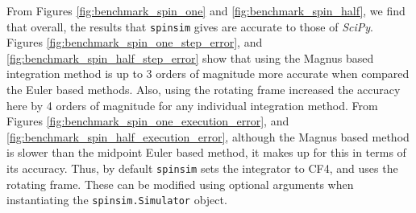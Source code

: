 \documentclass{jors}
\begin{document}
			From Figures \ref{fig:benchmark_spin_one} and \ref{fig:benchmark_spin_half}, we find that overall, the results that \texttt{spinsim} gives are accurate to those of \emph{SciPy}. Figures \ref{fig:benchmark_spin_one_step_error}, and \ref{fig:benchmark_spin_half_step_error} show that using the Magnus based integration method is up to 3 orders of magnitude more accurate when compared the Euler based methods. Also, using the rotating frame increased the accuracy here by 4 orders of magnitude for any individual integration method. From Figures \ref{fig:benchmark_spin_one_execution_error}, and \ref{fig:benchmark_spin_half_execution_error}, although the Magnus based method is slower than the midpoint Euler based method, it makes up for this in terms of its accuracy. Thus, by default \texttt{spinsim} sets the integrator to CF4, and uses the rotating frame. These can be modified using optional arguments when instantiating the \texttt{spinsim.Simulator} object.
\end{document}
